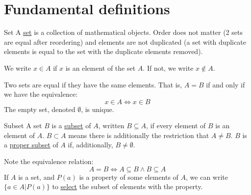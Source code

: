 \documentclass[../Main.tex]{subfiles}
\begin{document}
\section{Fundamental definitions}
\begin{definition}{Set}
    A \underline{set} is a collection of mathematical objects. Order does not matter (2 sets are equal after reordering) and elements are not duplicated (a set with duplicate elements is equal to the set with the duplicate elements removed).
\end{definition}
We write $x \in A$ if $x$ is an element of the set $A$. If not, we write $x \notin A$.\par
Two sets are equal if they have the same elements. That is, $A = B$ if and only if we have the equivalence:
\begin{equation*}
    x \in A \Leftrightarrow x \in B
\end{equation*}
The empty set, denoted $\emptyset$, is unique.
\begin{definition}{Subset}
    A set $B$ is a \underline{subset} of $A$, written $B \subseteq A$, if every element of $B$ is an element of $A$. $B \subset A$ means there is additionally the restriction that $A \neq B$. $B$ is a \underline{proper subset} of $A$ if, additionally, $B \neq \emptyset$.
\end{definition}
Note the equivalence relation:
\begin{equation*}
    A = B \Leftrightarrow A \subseteq B \land B \subseteq A
\end{equation*}
If $A$ is a set, and $P(a)$ is a property of some elements of $A$, we can write $\{a \in A | P(a)\}$ to \underline{select} the subset of elements with the property.
\end{document}
